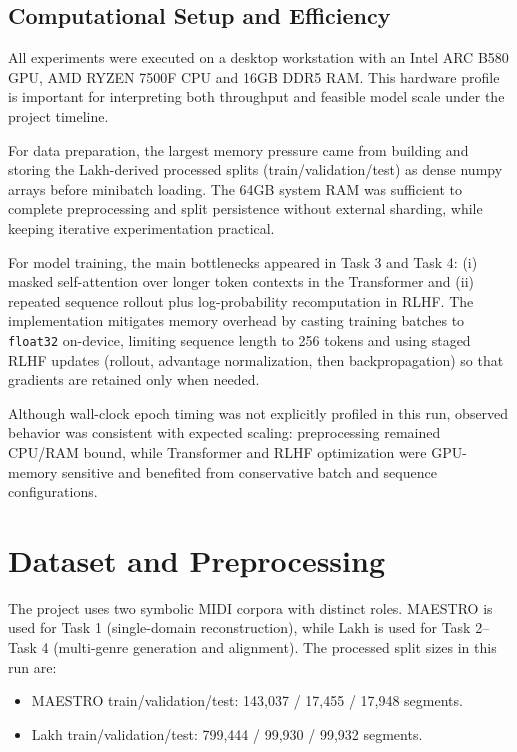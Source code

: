 \documentclass[conference]{IEEEtran}
\begin{document}
\subsection{Computational Setup and Efficiency}
All experiments were executed on a desktop workstation with an Intel ARC B580 GPU, AMD RYZEN 7500F CPU and 16GB DDR5 RAM. This hardware profile is important for interpreting both throughput and feasible model scale under the project timeline.

For data preparation, the largest memory pressure came from building and storing the Lakh-derived processed splits (train/validation/test) as dense numpy arrays before minibatch loading. The 64GB system RAM was sufficient to complete preprocessing and split persistence without external sharding, while keeping iterative experimentation practical.

For model training, the main bottlenecks appeared in Task 3 and Task 4: (i) masked self-attention over longer token contexts in the Transformer and (ii) repeated sequence rollout plus log-probability recomputation in RLHF. The implementation mitigates memory overhead by casting training batches to \texttt{float32} on-device, limiting sequence length to 256 tokens and using staged RLHF updates (rollout, advantage normalization, then backpropagation) so that gradients are retained only when needed.

Although wall-clock epoch timing was not explicitly profiled in this run, observed behavior was consistent with expected scaling: preprocessing remained CPU/RAM bound, while Transformer and RLHF optimization were GPU-memory sensitive and benefited from conservative batch and sequence configurations.

\section{Dataset and Preprocessing}
The project uses two symbolic MIDI corpora with distinct roles. MAESTRO is used for Task 1 (single-domain reconstruction), while Lakh is used for Task 2--Task 4 (multi-genre generation and alignment). The processed split sizes in this run are:

\begin{itemize}
\item MAESTRO train/validation/test: 143,037 / 17,455 / 17,948 segments.
\item Lakh train/validation/test: 799,444 / 99,930 / 99,932 segments.
\end{itemize}
\end{document}
